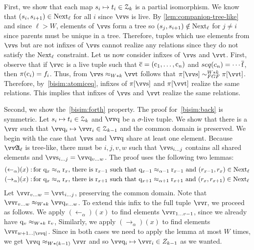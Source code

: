 First, we show that each map $s_{i} \mapsto t_{i} \in \mathcal{Z}_{k}$ is a partial isomorphism.
We know that $(s_{i}, s_{i+1}) \in \mathrm{Next}_{\ell}$ for all $i$ since $\elemtuptuples$ is live.
By \cref{lem:companion-tree-like} and since $\ell > W$, elements of $\elemtuptuples$ form a tree so $(s_{j}, s_{i+1}) \notin \mathrm{Next}_{\ell}$ for $j \ne i$ since parents must be unique in a tree.
Therefore, tuples which use elements from $\elemtuptuples$ but are not infixes of $\elemtuptuples$ cannot realize any relations since they do not satisfy the $\mathrm{Next}_{\ell}$ constraint.
Let us now consider infixes of $\elemtuptuples$ and $\elemtuptuplet$.
First, observe that if $\elemtuptuplec$ is a live tuple such that $\overline{\mathrm{c}} = (\mathrm{c}_{1}, \ldots, \mathrm{c}_{n})$ and $\seq{c_{n}} = \cdots \elemtuplef$, then $\pi(\mathrm{c}_{i}) = f_{i}$.
Thus, from $\elemtuptuples \approx_{W * k} \elemtuptuplet$ follows that $\pi[\elemtuptuples] \bisimto_{\FGF}^{W * k} \pi[\elemtuptuplet]$.
Therefore, by~\ref{bisim:atomiceq}, infixes of $\pi[\elemtuptuples]$ and $\pi[\elemtuptuplet]$ realize the same relations.
This implies that infixes of $\elemtuptuples$ and $\elemtuptuplet$ realize the same relations.

Second, we show the~\ref{bisim:forth} property.
The proof for~\ref{bisim:back} is symmetric.
Let $s_i \mapsto t_i \in \mathcal{Z}_{k}$ and $\elemtuptupleq$ be a $\sigma$-live tuple.
We show that there is a $\elemtuptupler$ such that $\elemtuptupleq_{i} \mapsto \elemtuptupler_{i} \in \bisimZ_{k-1}$ and the common domain is preserved.
We begin with the case that $\elemtuptuples$ and $\elemtuptupleq$ share at least one element.
Because $\unravel{A}_{\ell}$ is tree-like, there must be $i,j,v,w$ such that $\elemtuptuples_{i\ldots{j}}$ contains all shared elements and $\elemtuptuples_{i\ldots{}j} = \elemtuptupleq_{v\ldots{}w}$.
The proof uses the following two lemmas:
\begin{align*}
  (\leftarrow_{\alpha})(x):&\, \text{for $\mathrm{q}_{x} \approx_{\alpha} \mathrm{r}_{x}$, there is $\mathrm{r}_{x-1}$ such that $\mathrm{q}_{x-1} \approx_{\alpha-1} \mathrm{r}_{x-1}$ and $(r_{x-1}, r_{x}) \in \mathrm{Next}_{\ell}$} \\
  (\rightarrow_{\alpha})(x):&\, \text{for $\mathrm{q}_{x} \approx_{\alpha} \mathrm{r}_{x}$, there is $\mathrm{r}_{x+1}$ such that $\mathrm{q}_{x+1} \approx_{\alpha+1} \mathrm{r}_{x+1}$ and $(r_{x}, r_{x+1}) \in \mathrm{Next}_{\ell}$}
\end{align*}
Let $\elemtuptupler_{v\ldots{}w} = \elemtuptuplet_{i\ldots{}j}$, preserving the common domain.
Note that $\elemtuptupler_{v\ldots{}w} \approx_{W * k} \elemtuptupleq_{v\ldots{}w}$.
To extend this infix to the full tuple $\elemtuptupler$, we proceed as follows.
We apply $(\leftarrow_{\alpha})(x)$ to find elements $\elemtuptupler_{1\ldots{}v-1}$, since we already have $\mathrm{q}_{v} \approx_{W * k} \mathrm{r}_{v}$,
Similarly, we apply $(\rightarrow_{\alpha})(x)$ to find elements $\elemtuptupler_{w+1\ldots{}|\elemtuptupleq|}$.
Since in both cases we need to apply the lemma at most $W$ times, we get $\elemtuptupleq \approx_{W * (k-1)} \elemtuptupler$ and so $\elemtuptupleq_{i} \mapsto \elemtuptupler_{i} \in Z_{k-1}$ as we wanted.

